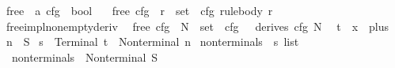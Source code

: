 %
\begin{isabellebody}%
%
%
\isadelimtheory
%
\endisadelimtheory
%
\isatagtheory
%
\endisatagtheory
{\isafoldtheory}%
%
\isadelimtheory
%
\endisadelimtheory
%
\isadelimdocument
%
\endisadelimdocument
%
\isatagdocument
%
\isamarkuptrue%
%
\endisatagdocument
{\isafolddocument}%
%
\isadelimdocument
%
\endisadelimdocument
{}\isamarkupfalse%
\ {\isasymepsilon}{\isacharunderscore}{\kern0pt}free\ {\isacharcolon}{\kern0pt}{\isacharcolon}{\kern0pt}\ {\isachardoublequoteopen}{\isacharprime}{\kern0pt}a\ cfg\ {\isasymRightarrow}\ bool{\isachardoublequoteclose}\ \isanewline
\ \ {\isachardoublequoteopen}{\isasymepsilon}{\isacharunderscore}{\kern0pt}free\ cfg\ {\isasymlongleftrightarrow}\ {\isacharparenleft}{\kern0pt}{\isasymforall}r\ {\isasymin}\ set\ {\isacharparenleft}{\kern0pt}{\isasymRR}\ cfg{\isacharparenright}{\kern0pt}{\isachardot}{\kern0pt}\ rule{\isacharunderscore}{\kern0pt}body\ r\ {\isasymnoteq}\ {\isacharbrackleft}{\kern0pt}{\isacharbrackright}{\kern0pt}{\isacharparenright}{\kern0pt}{\isachardoublequoteclose}\isanewline
\isanewline
{}\isamarkupfalse%
\ {\isasymepsilon}{\isacharunderscore}{\kern0pt}free{\isacharunderscore}{\kern0pt}impl{\isacharunderscore}{\kern0pt}non{\isacharunderscore}{\kern0pt}empty{\isacharunderscore}{\kern0pt}deriv{\isacharcolon}{\kern0pt}\isanewline
\ \ {\isachardoublequoteopen}{\isasymepsilon}{\isacharunderscore}{\kern0pt}free\ cfg\ {\isasymLongrightarrow}\ N\ {\isasymin}\ set\ {\isacharparenleft}{\kern0pt}{\isasymNN}\ cfg{\isacharparenright}{\kern0pt}\ {\isasymLongrightarrow}\ {\isasymnot}\ derives\ cfg\ {\isacharbrackleft}{\kern0pt}N{\isacharbrackright}{\kern0pt}\ {\isacharbrackleft}{\kern0pt}{\isacharbrackright}{\kern0pt}{\isachardoublequoteclose}%
\isadelimproof
%
\endisadelimproof
%
\isatagproof
%
\endisatagproof
{\isafoldproof}%
%
\isadelimproof
\isanewline
%
\endisadelimproof
{}\isamarkupfalse%
\ t\ {\isacharequal}{\kern0pt}\ x\ {\isacharbar}{\kern0pt}\ plus\isanewline
{}\isamarkupfalse%
\ n\ {\isacharequal}{\kern0pt}\ S\isanewline
{}\isamarkupfalse%
\ s\ {\isacharequal}{\kern0pt}\ Terminal\ t\ {\isacharbar}{\kern0pt}\ Nonterminal\ n\isanewline
\isanewline
{}\isamarkupfalse%
\ nonterminals\ {\isacharcolon}{\kern0pt}{\isacharcolon}{\kern0pt}\ {\isachardoublequoteopen}s\ list{\isachardoublequoteclose}\ \isanewline
\ \ {\isachardoublequoteopen}nonterminals\ {\isacharequal}{\kern0pt}\ {\isacharbrackleft}{\kern0pt}Nonterminal\ S{\isacharbrackright}{\kern0pt}{\isachardoublequoteclose}\isanewline

\end{isabellebody}
